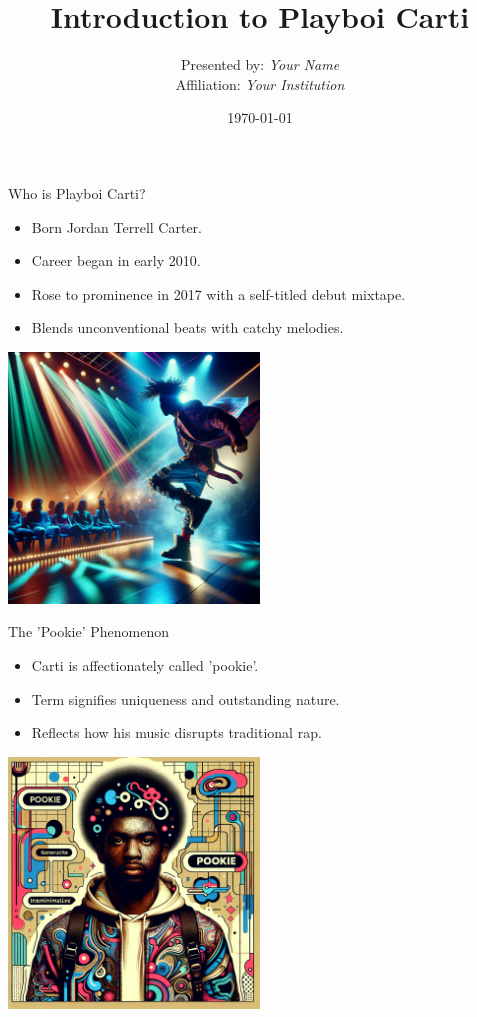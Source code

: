 \documentclass{beamer}
\title{Introduction to Playboi Carti}
\author{Presented by: \textit{Your Name} \\
Affiliation: \textit{Your Institution}}
\date{\today}
\begin{document}
\begin{frame}
    \titlepage
\end{frame}

\begin{frame}{Who is Playboi Carti?}
    \begin{itemize}
        \item Born Jordan Terrell Carter.
        \item Career began in early 2010.
        \item Rose to prominence in 2017 with a self-titled debut mixtape.
        \item Blends unconventional beats with catchy melodies.
    \end{itemize}
    \begin{center}
        \includegraphics[width=0.5\textwidth]{./images/PlayboiCarti1.png}
    \end{center}
\end{frame}

\begin{frame}{The 'Pookie' Phenomenon}
    \begin{itemize}
        \item Carti is affectionately called 'pookie'.
        \item Term signifies uniqueness and outstanding nature.
        \item Reflects how his music disrupts traditional rap.
    \end{itemize}
    \begin{center}
        \includegraphics[width=0.5\textwidth]{./images/PookiePhenomenon.png}
    \end{center}
\end{frame}
\end{document}
